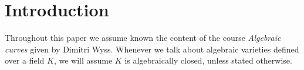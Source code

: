 \section*{Introduction}

Throughout this paper we assume known the content of the course \emph{Algebraic
curves} given by Dimitri Wyss.
Whenever we talk about algebraic varieties defined over a field $K$, we
will assume $K$ is algebraically closed, unless stated otherwise.
